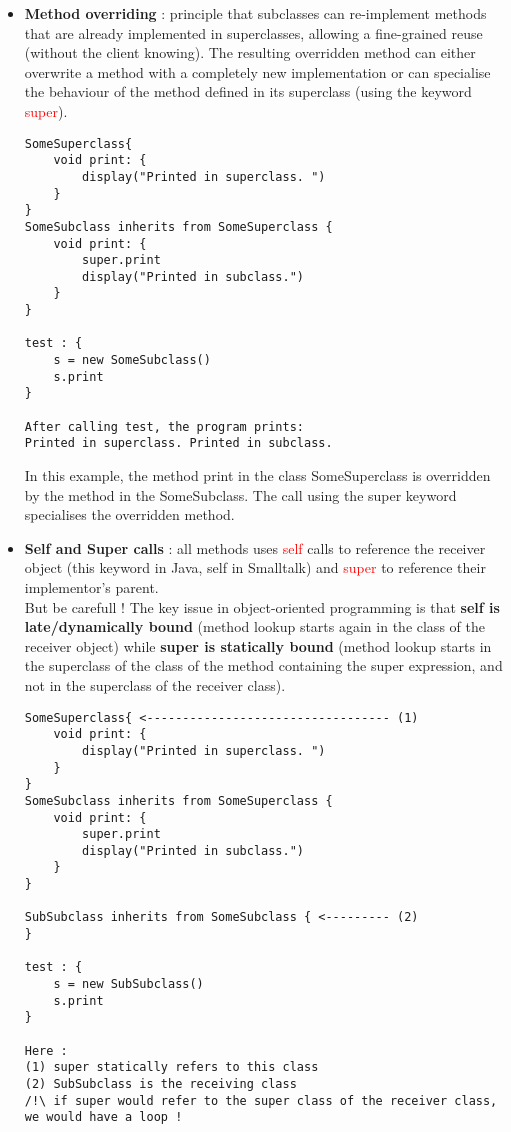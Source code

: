 \begin{itemize}
\item \textbf{Method overriding} : principle that subclasses can re-implement methods that are already implemented in superclasses, allowing a fine-grained reuse (without the client knowing). The resulting overridden method can either overwrite a method with a completely new implementation or can specialise the behaviour of the method defined in its superclass (using the keyword \textcolor{red}{super}).
\begin{lstlisting}[caption=Pseudocode example of Method Overridding]
SomeSuperclass{
	void print: {
		display("Printed in superclass. ")
    }
}
SomeSubclass inherits from SomeSuperclass {
	void print: {
		super.print
        display("Printed in subclass.")
    }
}

test : {
	s = new SomeSubclass()
	s.print
}

After calling test, the program prints:
Printed in superclass. Printed in subclass.
\end{lstlisting}
In this example, the method print in the class SomeSuperclass is overridden by the method in the SomeSubclass. The call using the super keyword specialises the overridden method.

\item \textbf{Self and Super calls} : all methods uses \textcolor{red}{self} calls to reference the receiver object (this keyword in Java, self in Smalltalk) and \textcolor{red}{super} to reference their implementor’s parent.\\
But be carefull ! The key issue in object-oriented programming is that \textbf{self is late/dynamically bound} (method lookup starts again in the class of the receiver object) while \textbf{super is statically bound} (method lookup starts in the superclass of the class of the method containing the super expression, and not in the superclass of the receiver class).

\begin{lstlisting}[caption=Pseudocode example of super calls]
SomeSuperclass{ <---------------------------------- (1)
	void print: {
		display("Printed in superclass. ")
    }
}
SomeSubclass inherits from SomeSuperclass {
	void print: {
		super.print
        display("Printed in subclass.")
    }
}

SubSubclass inherits from SomeSubclass { <--------- (2)
}

test : {
	s = new SubSubclass()
	s.print
}

Here :
(1) super statically refers to this class
(2) SubSubclass is the receiving class
/!\ if super would refer to the super class of the receiver class, we would have a loop !


\end{lstlisting}
\end{itemize}
